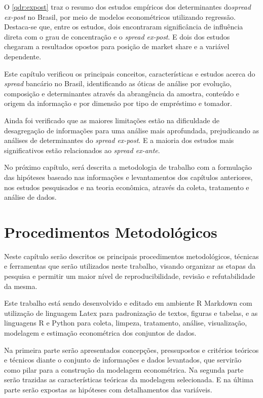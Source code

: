 \documentclass[
  12pt,
  12pt,
  openright,
  oneside,
  a4paper,
  chapter=TITLE,
  section=TITLE,
  subsection=TITLE,
  subsubsection=TITLE,
  english,
  portugues,
  sumario=tradicional]{abntex2}
\begin{document}
O \autoref{qdr:expost} traz o resumo dos estudos empíricos dos determinantes do\emph{spread ex-post} no Brasil, por meio de modelos econométricos utilizando regressão. Destaca-se que, entre os estudos, dois encontraram significância de influência direta com o grau de concentração e o \emph{spread ex-post}. E dois dos estudos chegaram a resultados opostos para posição de market share e a variável dependente.

Este capítulo verificou os principais conceitos, características e estudos acerca do \emph{spread} bancário no Brasil, identificando as óticas de análise por evolução, composição e determinantes através da abrangência da amostra, conteúdo e origem da informação e por dimensão por tipo de empréstimo e tomador.

Ainda foi verificado que as maiores limitações estão na dificuldade de desagregação de informações para uma análise mais aprofundada, prejudicando as análises de determinantes do \emph{spread ex-post}. E a maioria dos estudos mais significativos estão relacionados ao \emph{spread ex-ante}.

No próximo capítulo, será descrita a metodologia de trabalho com a formulação das hipóteses baseado nas informações e levantamentos dos capítulos anteriores, nos estudos pesquisados e na teoria econômica, através da coleta, tratamento e análise de dados.

\textual
\pagestyle{simple}
\parindent 1.50cm

\chapter{Procedimentos Metodológicos}

Neste capítulo serão descritos os principais procedimentos metodológicos, técnicas e ferramentas que serão utilizados neste trabalho, visando organizar as etapas da pesquisa e permitir um maior nível de reproducibilidade, revisão e refutabilidade da mesma.

Este trabalho está sendo desenvolvido e editado em ambiente R Markdown com utilização de linguagem Latex para padronização de textos, figuras e tabelas, e as linguagens R e Python para coleta, limpeza, tratamento, análise, visualização, modelagem e estimação econométrica dos conjuntos de dados.

Na primeira parte serão apresentados concepções, pressupostos e critérios teóricos e técnicos diante o conjunto de informações e dados levantados, que servirão como pilar para a construção da modelagem econométrica. Na segunda parte serão trazidas as características teóricas da modelagem selecionada. E na última parte serão expostas as hipóteses com detalhamentos das variáveis.
\end{document}
